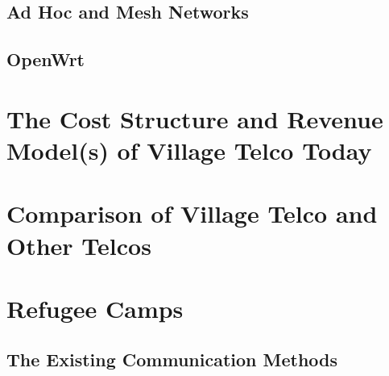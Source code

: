 \subsection{Ad Hoc and Mesh Networks}
\subsection{OpenWrt}


\section{The Cost Structure and Revenue Model(s) of Village Telco Today}

\section{Comparison of Village Telco and Other Telcos}

\section{Refugee Camps}
\subsection{The Existing Communication Methods}